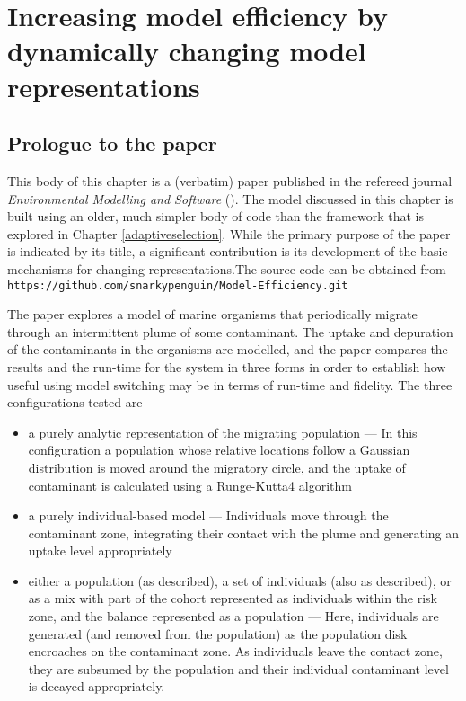 
\chapter[INCREASING MODEL EFFICIENCY BY DYNAMICALLY CHANGING MODEL
  REPRESENTATIONS]{ Increasing model efficiency by dynamically
  changing model representations}\label{modelefficiency}

\WeAreOn{\ctwo}
\section{Prologue to the paper}
This body of this chapter is a (verbatim) paper published in the
refereed journal \emph{Environmental Modelling and Software}
(\cite{Gray2012adaptive}).  The model discussed in this chapter is
built using an older, much simpler body of code than the framework
that is explored in Chapter \ref{adaptiveselection}. While the primary
purpose of the paper is indicated by its title, a significant
contribution is its development of the basic mechanisms for
changing representations.The source-code can be
obtained from\linebreak
\texttt{https://github.com/snarkypenguin/Model-Efficiency.git}

The paper explores a model of marine organisms that periodically
migrate through an intermittent plume of some contaminant.  The uptake
and depuration of the contaminants in the organisms are modelled, and
the paper compares the results and the run-time for the system in three
forms in order to establish how useful using model switching may be in
terms of run-time and fidelity.  The three configurations tested are
\begin{itemize}
\item a purely analytic representation of the
  migrating population --- In this configuration a population whose
  relative locations follow a Gaussian distribution is moved around the
  migratory circle, and the uptake of contaminant is calculated using
  a Runge-Kutta4 algorithm
\item a purely individual-based model --- Individuals move through the
  contaminant zone, integrating their contact with the plume and
  generating an uptake level appropriately
\item either a population (as described), a set of individuals (also
  as described), or as a mix with part of the cohort represented as
  individuals within the risk zone, and the balance represented as a
  population --- Here, individuals are generated (and removed from the
  population) as the population disk encroaches on the contaminant
  zone. As individuals leave the contact zone, they are subsumed by
  the population and their individual contaminant level is decayed
  appropriately.
\end{itemize}

